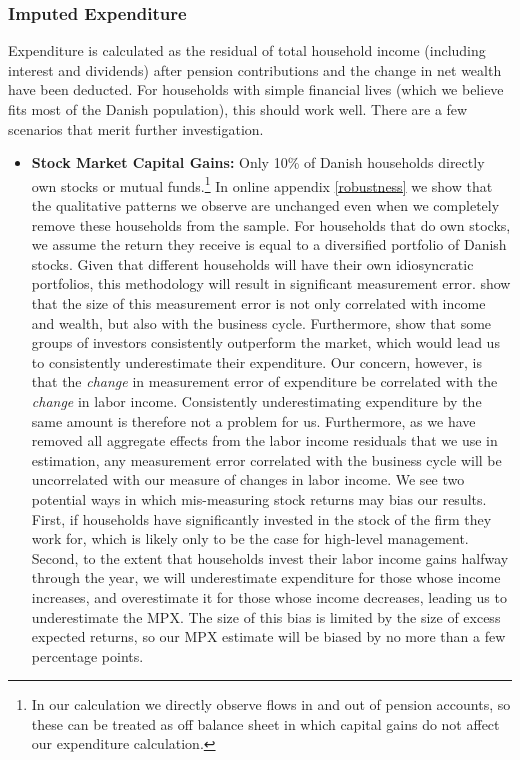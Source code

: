 \documentclass[titlepage]{\econtex}\newcommand{\texname}{ConsumptionHeterogeneity}
\begin{document}
	\subsubsection{Imputed Expenditure}
	Expenditure is calculated as the residual of total household income (including interest and dividends) after pension contributions and the change in net wealth have been deducted. For households with simple financial lives (which we believe fits most of the Danish population), this should work well. There are a few scenarios that merit further investigation.
	\begin{itemize}
		\item \textbf{Stock Market Capital Gains:} Only 10\% of Danish households directly own stocks or mutual funds.\footnote{In our calculation we directly observe flows in and out of pension accounts, so these can be treated as off balance sheet in which capital gains do not affect our expenditure calculation.} In online appendix \ref{robustness} we show that the qualitative patterns we observe are unchanged even when we completely remove these households from the sample. For households that do own stocks, we assume the return they receive is equal to a diversified portfolio of Danish stocks. Given that different households will have their own idiosyncratic portfolios, this methodology will result in significant measurement error. \cite{baker_measurement_2018} show that the size of this measurement error is not only correlated with income and wealth, but also with the business cycle. Furthermore, \cite{fagereng_persistence_2016} show that some groups of investors consistently outperform the market, which would lead us to consistently underestimate their expenditure. Our concern, however, is that the \textit{change} in measurement error of expenditure be correlated with the \textit{change} in labor income. Consistently underestimating expenditure by the same amount is therefore not a problem for us. Furthermore, as we have removed all aggregate effects from the labor income residuals that we use in estimation, any measurement error correlated with the business cycle will be uncorrelated with our measure of changes in labor income. We see two potential ways in which mis-measuring stock returns may bias our results. First, if households have significantly invested in the stock of the firm they work for, which is likely only to be the case for high-level management. Second, to the extent that households invest their labor income gains halfway through the year, we will underestimate expenditure for those whose income increases, and overestimate it for those whose income decreases, leading us to underestimate the MPX. The size of this bias is limited by the size of excess expected returns, so our MPX estimate will be biased by no more than a few percentage points.

\end{itemize}
\end{document}

